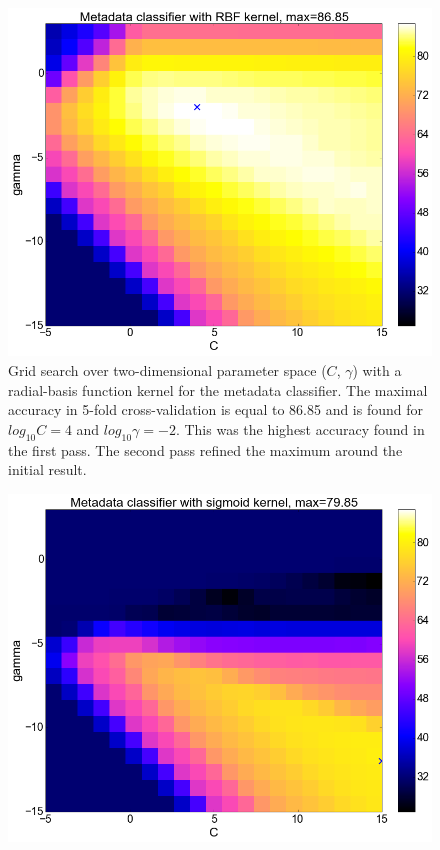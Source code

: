 \begin{center}
\begin{figure}
	\centering
  \includegraphics[width=\textwidth]{plots/meta_rbf}
   \caption{Grid search over two-dimensional parameter space ($C$, $\gamma$) with a radial-basis function kernel for the metadata classifier. The maximal accuracy in 5-fold cross-validation is equal to 86.85 and is found for $log_{10}C=4$ and $log_{10}\gamma=-2$. This was the highest accuracy found in the first pass. The second pass refined the maximum around the initial result.}
  \label{fig:meta_rbf}
\end{figure}
\begin{figure}
	\centering
  \includegraphics[width=\textwidth]{plots/meta_sigmoid}

\end{figure}
\end{center}
